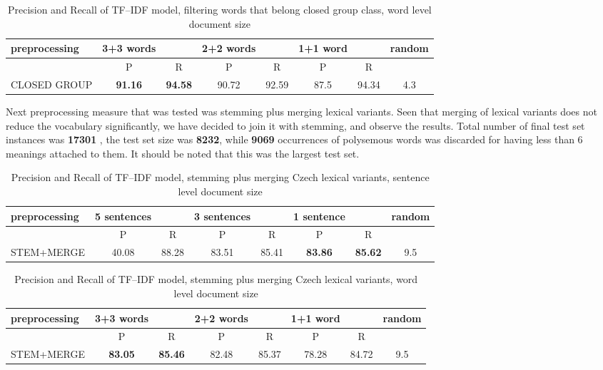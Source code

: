 \begin{table}[h!]
\begin{tabular}{ l | c c | c c | c c | c}
   preprocessing &  3+3 words && 2+2 words && 1+1 word  && random\\
\hline\hline
	& P  &  R & P  &  R & P  &  R &\\
\hline
CLOSED GROUP & \textbf{91.16}  & \textbf{94.58} & 90.72 & 92.59 & 87.5  & 94.34  & 4.3  \\
\end{tabular}
\caption{Precision and Recall of TF--IDF model, filtering words that belong closed group class, word level document size}
\end{table}

Next preprocessing measure that was tested was stemming plus merging lexical variants. Seen that
merging of lexical variants does not reduce the vocabulary significantly, we have decided to join it
with stemming, and observe the results. Total number of final test set instances was  \textbf{17301} , the test set size was \textbf{8232}, while \textbf{9069} occurrences of polysemous words was discarded for having less than 6 meanings attached to them. It should be noted that this was the largest test set.

\begin{table}[h!]
\begin{tabular}{ l | c c | c c | c c | c}
   preprocessing &  5 sentences && 3 sentences && 1 sentence  && random\\
\hline
	& P  &  R & P  &  R & P  &  R &\\
\hline\hline
STEM+MERGE & 40.08  & 88.28  & 83.51  & 85.41  & \textbf{83.86}  &  \textbf{85.62} & 9.5  \\
\end{tabular}
\caption{Precision and Recall of TF--IDF model, stemming plus merging Czech lexical variants, sentence level document size}
\end{table}

\begin{table}[h!]
\begin{tabular}{ l | c c | c c | c c | c}
   preprocessing &  3+3 words && 2+2 words && 1+1 word  && random\\
\hline\hline
	& P  &  R & P  &  R & P  &  R &\\
\hline
STEM+MERGE & \textbf{ 83.05}  & \textbf{85.46}  & 82.48 &  85.37 & 78.28  &  84.72 & 9.5\\
\end{tabular}
\caption{Precision and Recall of TF--IDF model, stemming plus merging Czech lexical variants, word level document size}
\end{table}


